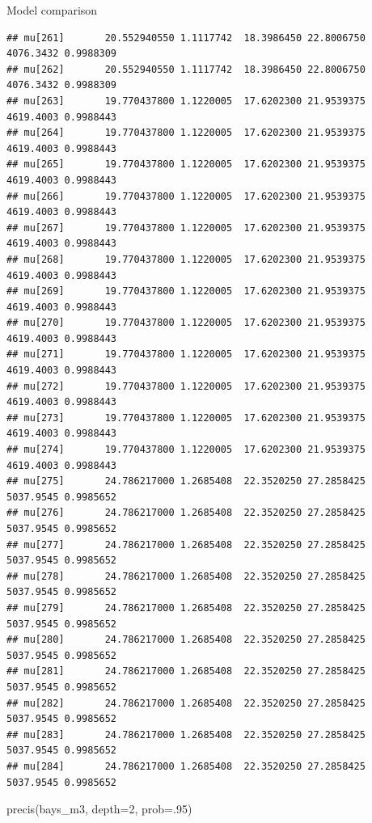 \documentclass[
  ignorenonframetext,
]{beamer}
\newenvironment{Shaded}{\begin{snugshade}}{\end{snugshade}}
\newcommand{\AttributeTok}[1]{\textcolor[rgb]{0.77,0.63,0.00}{#1}}
\newcommand{\DecValTok}[1]{\textcolor[rgb]{0.00,0.00,0.81}{#1}}
\newcommand{\FunctionTok}[1]{\textcolor[rgb]{0.00,0.00,0.00}{#1}}
\newcommand{\NormalTok}[1]{#1}
\begin{document}
\begin{frame}[fragile]{Model comparison}
\begin{verbatim}
## mu[261]       20.552940550 1.1117742  18.3986450 22.8006750 4076.3432 0.9988309
## mu[262]       20.552940550 1.1117742  18.3986450 22.8006750 4076.3432 0.9988309
## mu[263]       19.770437800 1.1220005  17.6202300 21.9539375 4619.4003 0.9988443
## mu[264]       19.770437800 1.1220005  17.6202300 21.9539375 4619.4003 0.9988443
## mu[265]       19.770437800 1.1220005  17.6202300 21.9539375 4619.4003 0.9988443
## mu[266]       19.770437800 1.1220005  17.6202300 21.9539375 4619.4003 0.9988443
## mu[267]       19.770437800 1.1220005  17.6202300 21.9539375 4619.4003 0.9988443
## mu[268]       19.770437800 1.1220005  17.6202300 21.9539375 4619.4003 0.9988443
## mu[269]       19.770437800 1.1220005  17.6202300 21.9539375 4619.4003 0.9988443
## mu[270]       19.770437800 1.1220005  17.6202300 21.9539375 4619.4003 0.9988443
## mu[271]       19.770437800 1.1220005  17.6202300 21.9539375 4619.4003 0.9988443
## mu[272]       19.770437800 1.1220005  17.6202300 21.9539375 4619.4003 0.9988443
## mu[273]       19.770437800 1.1220005  17.6202300 21.9539375 4619.4003 0.9988443
## mu[274]       19.770437800 1.1220005  17.6202300 21.9539375 4619.4003 0.9988443
## mu[275]       24.786217000 1.2685408  22.3520250 27.2858425 5037.9545 0.9985652
## mu[276]       24.786217000 1.2685408  22.3520250 27.2858425 5037.9545 0.9985652
## mu[277]       24.786217000 1.2685408  22.3520250 27.2858425 5037.9545 0.9985652
## mu[278]       24.786217000 1.2685408  22.3520250 27.2858425 5037.9545 0.9985652
## mu[279]       24.786217000 1.2685408  22.3520250 27.2858425 5037.9545 0.9985652
## mu[280]       24.786217000 1.2685408  22.3520250 27.2858425 5037.9545 0.9985652
## mu[281]       24.786217000 1.2685408  22.3520250 27.2858425 5037.9545 0.9985652
## mu[282]       24.786217000 1.2685408  22.3520250 27.2858425 5037.9545 0.9985652
## mu[283]       24.786217000 1.2685408  22.3520250 27.2858425 5037.9545 0.9985652
## mu[284]       24.786217000 1.2685408  22.3520250 27.2858425 5037.9545 0.9985652
\end{verbatim}

\begin{Shaded}
\begin{Highlighting}[]
\FunctionTok{precis}\NormalTok{(bays\_m3, }\AttributeTok{depth=}\DecValTok{2}\NormalTok{, }\AttributeTok{prob=}\NormalTok{.}\DecValTok{95}\NormalTok{)}
\end{Highlighting}
\end{Shaded}


\end{frame}
\end{document}
